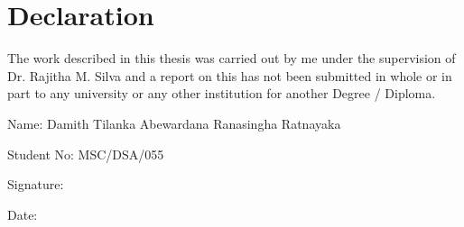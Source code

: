 \chapter*{Declaration}
\thispagestyle{empty}

The work described in this thesis was carried out by me under the supervision of Dr.
Rajitha M. Silva and a report on this has not been submitted in whole or in part to any
university or any other institution for another Degree / Diploma.

\vspace{1cm}
\noindent Name: Damith Tilanka Abewardana Ranasingha Ratnayaka

\noindent Student No: MSC/DSA/055

\noindent Signature: \underline{\hspace{6cm}}

\noindent Date: \underline{\hspace{6cm}}
